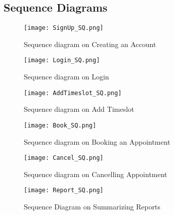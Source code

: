 \subsection{Sequence Diagrams}

\begin{figure}[!h]                %
\centering                    %
\texttt{[image: SignUp\_SQ.png]}     
\caption{Sequence diagram on Creating an Account }
\label{fig:createacctsq}
\end{figure}


\newpage
\begin{figure}[!h]                %
\centering                    %
\texttt{[image: Login\_SQ.png]}     
\caption{Sequence diagram on Login }
\label{fig:loginsq}
\end{figure}

\newpage
\begin{figure}[!h]                %
\centering                    %
\texttt{[image: AddTimeslot\_SQ.png]}     
\caption{Sequence diagram on Add Timeslot }
\label{fig:timeslotsq}
\end{figure}

\newpage
\begin{figure}[!h]                %
\centering                    %
\texttt{[image: Book\_SQ.png]}     
\caption{Sequence diagram on Booking an Appointment }
\label{fig:bookappsq}
\end{figure}


\begin{figure}[!hp]                %
\centering                    %
\texttt{[image: Cancel\_SQ.png]}     
\caption{Sequence diagram on Cancelling Appointment }
\label{fig:cancelsq}
\end{figure}


\begin{figure}[!hp]                %
\centering                    %
\texttt{[image: Report\_SQ.png]}     
\caption{Sequence Diagram on Summarizing Reports }
\label{fig:repsq}
\end{figure}


